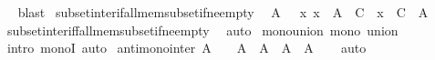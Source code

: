 \begin{isabellebody}
\isadelimproof
\ %
\endisadelimproof
%
\isatagproof
{}\isamarkupfalse%
\ blast%
\endisatagproof
{\isafoldproof}%
%
\isadelimproof
%
\endisadelimproof
\isanewline
\isanewline
{}\isamarkupfalse%
\ subset{\isacharunderscore}{\kern0pt}inter{\isacharunderscore}{\kern0pt}if{\isacharunderscore}{\kern0pt}all{\isacharunderscore}{\kern0pt}mem{\isacharunderscore}{\kern0pt}subset{\isacharunderscore}{\kern0pt}if{\isacharunderscore}{\kern0pt}ne{\isacharunderscore}{\kern0pt}empty{\isacharcolon}{\kern0pt}\isanewline
\ \ {\isachardoublequoteopen}{\isasymlbrakk}A\ {\isasymnoteq}\ {\isacharbraceleft}{\kern0pt}{\isacharbraceright}{\kern0pt}{\isacharsemicolon}{\kern0pt}\ {\isasymAnd}x{\isachardot}{\kern0pt}\ x\ {\isasymin}\ A\ {\isasymLongrightarrow}\ C\ {\isasymsubseteq}\ x{\isasymrbrakk}\ {\isasymLongrightarrow}\ C\ {\isasymsubseteq}\ {\isasymInter}A{\isachardoublequoteclose}\isanewline
%
\isadelimproof
\ \ %
\endisadelimproof
%
\isatagproof
{}\isamarkupfalse%
\ subset{\isacharunderscore}{\kern0pt}inter{\isacharunderscore}{\kern0pt}iff{\isacharunderscore}{\kern0pt}all{\isacharunderscore}{\kern0pt}mem{\isacharunderscore}{\kern0pt}subset{\isacharunderscore}{\kern0pt}if{\isacharunderscore}{\kern0pt}ne{\isacharunderscore}{\kern0pt}empty\ \isamarkupfalse%
\ auto%
\endisatagproof
{\isafoldproof}%
%
\isadelimproof
\isanewline
%
\endisadelimproof
\isanewline
{}\isamarkupfalse%
\ mono{\isacharunderscore}{\kern0pt}union{\isacharcolon}{\kern0pt}\ {\isachardoublequoteopen}mono\ union{\isachardoublequoteclose}\isanewline
%
\isadelimproof
\ \ %
\endisadelimproof
%
\isatagproof
{}\isamarkupfalse%
\ {\isacharparenleft}{\kern0pt}intro\ monoI{\isacharparenright}{\kern0pt}\ auto%
\endisatagproof
{\isafoldproof}%
%
\isadelimproof
\isanewline
%
\endisadelimproof
\isanewline
{}\isamarkupfalse%
\ antimono{\isacharunderscore}{\kern0pt}inter{\isacharcolon}{\kern0pt}\ {\isachardoublequoteopen}A\ {\isasymnoteq}\ {\isacharbraceleft}{\kern0pt}{\isacharbraceright}{\kern0pt}\ {\isasymLongrightarrow}\ A\ {\isasymsubseteq}\ A{\isacharprime}{\kern0pt}\ {\isasymLongrightarrow}\ {\isasymInter}A{\isacharprime}{\kern0pt}\ {\isasymsubseteq}\ {\isasymInter}A{\isachardoublequoteclose}\isanewline
%
\isadelimproof
\ \ %
\endisadelimproof
%
\isatagproof
{}\isamarkupfalse%
\ auto%
\endisatagproof
{\isafoldproof}%
%
\isadelimproof
%
\endisadelimproof
%
\isadelimdocument
%
\endisadelimdocument
%
\isatagdocument
%
\isamarkuptrue%
%
\endisatagdocument

\end{isabellebody}
